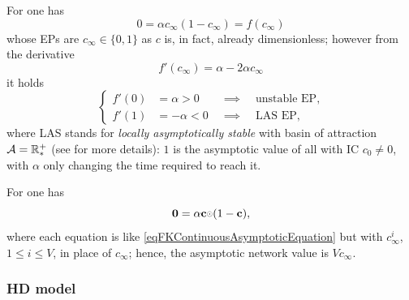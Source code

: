 \documentclass{article}
\begin{document}
                For \FKcontinuous{} one has
                \begin{equation}
                    0=\alpha c_\infty\left(1-c_\infty\right)=f(c_\infty)
                    \label{eqFKContinuousAsymptoticEquation}
                \end{equation}
                whose EPs are $c_\infty\in\{0,1\}$ as $c$ is, in fact, already dimensionless; however from the derivative
                \begin{equation*}
                    f'(c_\infty)=\alpha-2\alpha c_\infty
                \end{equation*}
                it holds
                \begin{equation}
                    \left\{
                    \begin{alignedat}{2}
                        f'(0)&=\alpha>0&\;\;\implies\;\;&\text{unstable EP},\\
                        f'(1)&=-\alpha<0&\;\;\implies\;\;&\text{LAS EP},
                    \end{alignedat}
                    \right.
                    \label{eqFKEPStability}
                \end{equation}
                where LAS stands for \textit{locally asymptotically stable} with basin of attraction $\mathcal A=\mathbb R_*^+$ (see \cite{NLDCStrogatz2024} for more details): $1$ is the asymptotic value of all \FKcontinuous{} with IC $c_0\neq0$, with $\alpha$ only changing the time required to reach it.

                For \FKdiscrete{} one has
                \begin{equation}
                    \boldsymbol0=\alpha\mathbf c\HadProd(1-\mathbf c),
                    \label{eqFKDiscreteAsymptoticEquation}
                \end{equation}
                where each equation is like \eqref{eqFKContinuousAsymptoticEquation} but with $c^i_\infty$, $1\le i\le V$, in place of $c_\infty$; hence, the asymptotic network value is $Vc_\infty$.


            \subsubsection{HD model}\label{secAsymptoticAnalysisHD}
\end{document}
